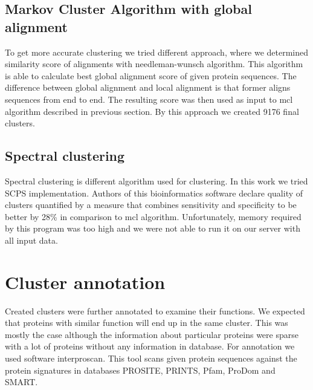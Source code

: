 \subsection{Markov Cluster Algorithm with global alignment}
To get more accurate clustering we tried different approach, where we determined similarity score of alignments with needleman-wunsch algorithm. \cite{needleman-wunsch}
This algorithm is able to calculate best global alignment score of given protein sequences.
The difference between global alignment and local alignment is that former aligns sequences from end to end.
The resulting score was then used as input to mcl algorithm described in previous section.
By this approach we created 9176 final clusters.

\subsection{Spectral clustering}
Spectral clustering is different algorithm used for clustering.
In this work we tried SCPS implementation\cite{scps}.
Authors of this bioinformatics software declare quality of clusters quantified by a measure that combines sensitivity and specificity to be better by 28\% in comparison to mcl algorithm.
Unfortunately, memory required by this program was too high and we were not able to run it on our server with all input data. 


\section{Cluster annotation}
Created clusters were further annotated to examine their functions.
We expected that proteins with similar function will end up in the same cluster. 
This was mostly the case although the information about particular proteins were sparse with a lot of proteins without any information in database.
For annotation we used software interproscan\cite{interpro}.
This tool scans given protein sequences against the protein signatures in databases PROSITE, PRINTS, Pfam, ProDom and SMART.

